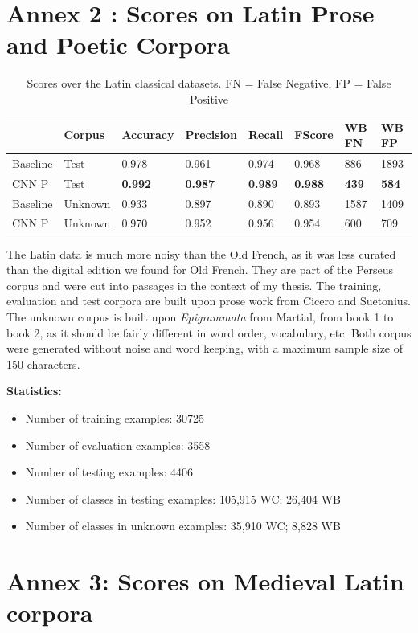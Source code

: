 \documentclass{jdmdh}
\begin{document}
\section{Annex 2 : Scores on Latin Prose and Poetic Corpora}

\begin{table}[H]
\centering
\begin{tabular}{llllllll}
\hline
 & Corpus & Accuracy & Precision & Recall & FScore & WB FN & WB FP \\ \hline
Baseline & Test & 0.978 & 0.961 & 0.974 & 0.968 & 886 & 1893 \\
CNN P & Test & \textbf{0.992} & \textbf{0.987} & \textbf{0.989} & \textbf{0.988} & \textbf{439} & \textbf{584} \\ \hline
Baseline & Unknown & 0.933 & 0.897 & 0.890 & 0.893 & 1587 & 1409 \\
CNN P & Unknown & 0.970 & 0.952 & 0.956 & 0.954 & 600 & 709 \\ \hline
\end{tabular}
\caption{Scores over the Latin classical datasets. FN = False Negative, FP = False Positive}
\label{tab:latin_corpora}
\end{table}

The Latin data is much more noisy than the Old French, as it was less curated than the digital edition we found for Old French. They are part of the Perseus corpus \citet{perseus} and were cut into passages in the context of my thesis. The training, evaluation and test corpora are built upon prose work from Cicero and Suetonius. The unknown corpus is built upon \textit{Epigrammata} from Martial, from book 1 to book 2, as it should be fairly different in word order, vocabulary, etc. Both corpus were generated without noise and word keeping, with a maximum sample size of 150 characters.

\textbf{Statistics:}
\begin{itemize}
\item Number of training examples: 30725
\item Number of evaluation examples: 3558
\item Number of testing examples: 4406
\item Number of classes in testing examples: 105,915 WC; 26,404 WB
\item Number of classes in unknown examples: 35,910 WC; 8,828 WB
\end{itemize}

\section{Annex 3: Scores on Medieval Latin corpora}
\end{document}
